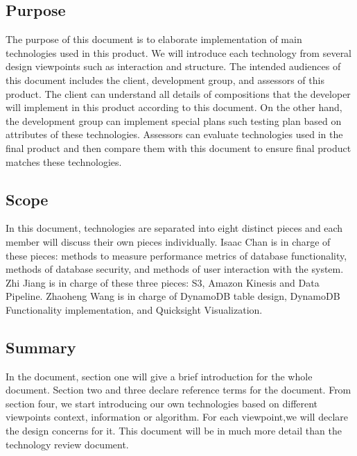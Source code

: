 \subsection{Purpose}
The purpose of this document is to elaborate implementation of main technologies used in this product. We will introduce each technology from several design viewpoints such as interaction and structure. The intended audiences of this document includes the client, development group, and assessors of this product. The client can understand all details of compositions that the developer will implement in this product according to this document. On the other hand, the development group can implement special plans such testing plan based on attributes of these technologies. Assessors can evaluate technologies used in the final product and then compare them with this document to ensure final product matches these technologies.  

\subsection{Scope}
In this document, technologies are separated into eight distinct pieces and each member will discuss their own pieces individually. Isaac Chan is in charge of these pieces: methods to measure performance metrics of database functionality, methods of database security, and methods of user interaction with the system. Zhi Jiang is in charge of these three pieces: S3, Amazon Kinesis and Data Pipeline. Zhaoheng Wang is in charge of DynamoDB table design, DynamoDB Functionality implementation, and Quicksight Visualization.

\subsection{Summary}
In the document, section one will give a brief introduction for the whole document. Section two and three declare reference terms for the document. From section four, we start introducing our own technologies based on different viewpoints context, information or algorithm. For each viewpoint,we will declare the design concerns for it. This document will be in much more detail than the technology review document.  
 
